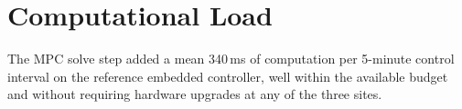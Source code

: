 \section{Computational Load}
The MPC solve step added a mean 340\,ms of computation per 5-minute control interval on the
reference embedded controller, well within the available budget and without requiring hardware
upgrades at any of the three sites.
